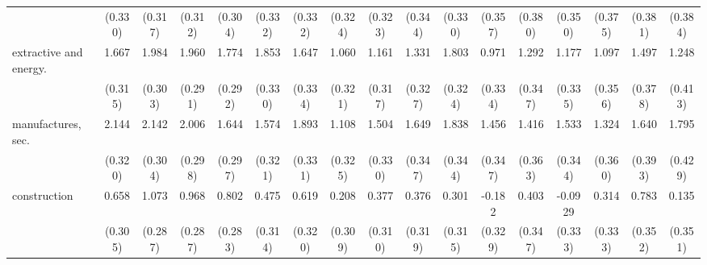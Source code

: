 {\begin{tabular}{l*{16}{c}}
                    &     (0.330)         &     (0.317)         &     (0.312)         &     (0.304)         &     (0.332)         &     (0.332)         &     (0.324)         &     (0.323)         &     (0.344)         &     (0.330)         &     (0.357)         &     (0.380)         &     (0.350)         &     (0.375)         &     (0.381)         &     (0.384)         \\
[1em]
extractive and energy.&       1.667\sym{***}&       1.984\sym{***}&       1.960\sym{***}&       1.774\sym{***}&       1.853\sym{***}&       1.647\sym{***}&       1.060\sym{***}&       1.161\sym{***}&       1.331\sym{***}&       1.803\sym{***}&       0.971\sym{**} &       1.292\sym{***}&       1.177\sym{***}&       1.097\sym{**} &       1.497\sym{***}&       1.248\sym{**} \\
                    &     (0.315)         &     (0.303)         &     (0.291)         &     (0.292)         &     (0.330)         &     (0.334)         &     (0.321)         &     (0.317)         &     (0.327)         &     (0.324)         &     (0.334)         &     (0.347)         &     (0.335)         &     (0.356)         &     (0.378)         &     (0.413)         \\
[1em]
manufactures, sec.  &       2.144\sym{***}&       2.142\sym{***}&       2.006\sym{***}&       1.644\sym{***}&       1.574\sym{***}&       1.893\sym{***}&       1.108\sym{***}&       1.504\sym{***}&       1.649\sym{***}&       1.838\sym{***}&       1.456\sym{***}&       1.416\sym{***}&       1.533\sym{***}&       1.324\sym{***}&       1.640\sym{***}&       1.795\sym{***}\\
                    &     (0.320)         &     (0.304)         &     (0.298)         &     (0.297)         &     (0.321)         &     (0.331)         &     (0.325)         &     (0.330)         &     (0.347)         &     (0.344)         &     (0.347)         &     (0.363)         &     (0.344)         &     (0.360)         &     (0.393)         &     (0.429)         \\
[1em]
construction        &       0.658\sym{*}  &       1.073\sym{***}&       0.968\sym{***}&       0.802\sym{**} &       0.475         &       0.619         &       0.208         &       0.377         &       0.376         &       0.301         &      -0.182         &       0.403         &     -0.0929         &       0.314         &       0.783\sym{*}  &       0.135         \\
                    &     (0.305)         &     (0.287)         &     (0.287)         &     (0.283)         &     (0.314)         &     (0.320)         &     (0.309)         &     (0.310)         &     (0.319)         &     (0.315)         &     (0.329)         &     (0.347)         &     (0.333)         &     (0.333)         &     (0.352)         &     (0.351)         \\

\end{tabular}}
